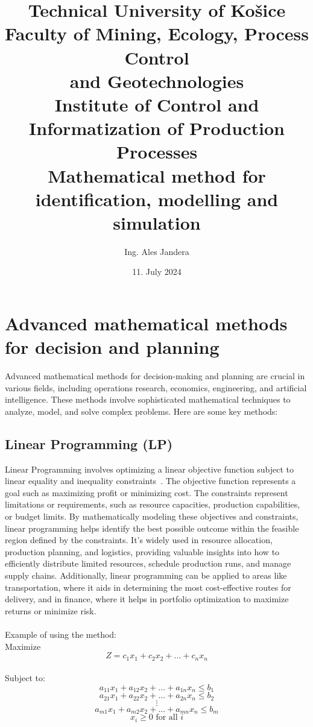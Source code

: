 \documentclass[12pt]{article}
\title{
{\textbf{Technical University of Košice}}\\
\vspace{12pt}
{\large \textbf{Faculty of Mining, Ecology, Process Control\\ and Geotechnologies}}\\
\vspace{12pt}
{\large Institute of Control and Informatization of Production Processes}\\
\vspace{64pt}
{\textbf{Mathematical method for identification, modelling and simulation}}\\
}
\author{Ing. Ales Jandera}
\date{11. July 2024}
\begin{document}
\maketitle

\newpage

\tableofcontents

\newpage

\section{Advanced mathematical methods for decision and planning}
Advanced mathematical methods for decision-making and planning are crucial
in various fields, including operations research, economics, engineering,
and artificial intelligence. These methods involve sophisticated mathematical
techniques to analyze, model, and solve complex problems. Here are some key methods:

\subsection{Linear Programming (LP)}
Linear Programming involves optimizing a linear objective function subject to
linear equality and inequality constraints~\cite{vanderbei2020linear}. The objective function represents a goal
such as maximizing profit or minimizing cost. The constraints represent limitations
or requirements, such as resource capacities, production capabilities, or budget
limits. By mathematically modeling these objectives and constraints, linear
programming helps identify the best possible outcome within the feasible region
defined by the constraints. It's widely used in resource allocation, production
planning, and logistics, providing valuable insights into how to efficiently
distribute limited resources, schedule production runs, and manage supply chains.
Additionally, linear programming can be applied to areas like transportation, where
it aids in determining the most cost-effective routes for delivery, and in finance,
where it helps in portfolio optimization to maximize returns or minimize risk.\\
\\
Example of using the method:\\
Maximize\\\[ Z = c_1x_1 + c_2x_2 + \ldots + c_nx_n \]\\
Subject to:\\
\[ a_{11}x_1 + a_{12}x_2 + \ldots + a_{1n}x_n \leq b_1 \]
\[ a_{21}x_1 + a_{22}x_2 + \ldots + a_{2n}x_n \leq b_2 \]
\[ \vdots \]
\[ a_{m1}x_1 + a_{m2}x_2 + \ldots + a_{mn}x_n \leq b_m \]
\[ x_i \geq 0 \text{ for all } i \]
\end{document}
